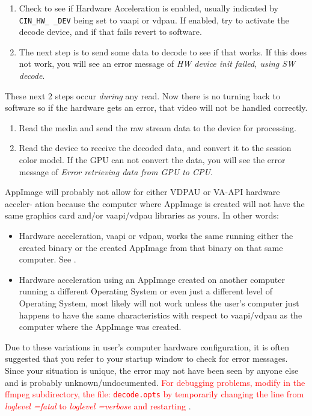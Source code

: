 \begin{enumerate}
	\item Check to see if Hardware Acceleration is enabled, usually indicated by \texttt{CIN\_HW\_ \_DEV} being set to
	vaapi or vdpau.  If enabled, try to activate the decode device, and if that fails revert to software.
	\item The next step is to send some data to decode to see if that works. If this does not work, you will see
	an error message of \textit{HW device init failed, using SW decode}.
\end{enumerate}

\noindent These next 2 steps occur \textit{during} any read.  Now there is no turning back to software so if the hardware gets an error, that video will not be handled correctly.

\begin{enumerate} [resume]
	\item Read the media and send the raw stream data to the device for processing.
	\item Read the device to receive the decoded data, and convert it to the session color model.  If the GPU
	can not convert the data, you will see the error message of \textit{Error retrieving data from GPU to CPU}.
\end{enumerate}

AppImage will probably not allow for either VDPAU or VA-API hardware acceler-
ation because the computer where AppImage is created will not have the same
graphics card and/or vaapi/vdpau libraries as yours. In other words:

\begin{itemize}
	\item Hardware acceleration, vaapi or vdpau, works the same running either the	created binary or the created AppImage from that binary on that same computer. See .
	\item Hardware acceleration using an AppImage created on another computer running a different Operating System or even just a different level of Operating System, most likely will not work unless the user’s computer just happens to have the same characteristics with respect to vaapi/vdpau as the computer where the AppImage was created.
\end{itemize}

Due to these variations in user’s computer hardware configuration, it is often suggested that you refer to your startup window to check for error messages.   Since your situation is unique, the error may not have been seen by anyone else and is probably unknown/undocumented.
\textcolor{red}{For debugging problems, modify in the \CGG{} ffmpeg subdirectory, the file:  \texttt{decode.opts}   by temporarily changing the line from \textit{loglevel =fatal} to \textit{loglevel =verbose} and restarting \CGG{}}.  

